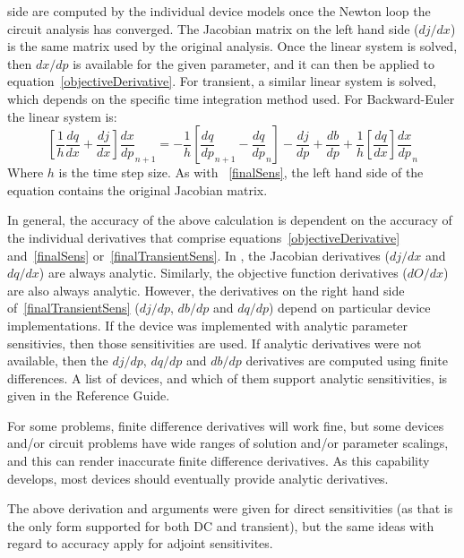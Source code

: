 side are computed by the individual device models once the Newton loop
the circuit analysis has converged.  The Jacobian matrix on the left
hand side ($dj/dx$) is the same matrix used by the original analysis.
Once the linear system is solved, then $dx/dp$ is available for the
given parameter, and it can then be applied to
equation~\ref{objectiveDerivative}.  For transient, a similar linear
system is solved, which depends on the specific time integration
method used.  For Backward-Euler the linear system is:
\begin{equation}
  \left[ \frac{1}{h} \frac{dq}{dx} 
  + \frac{dj}{dx} \right] \frac{dx}{dp}_{n+1} 
 =
  -\frac{1}{h} \left[ \frac{dq}{dp}_{n+1} - \frac{dq}{dp}_n \right] 
 - \frac{dj}{dp} 
 + \frac{db}{dp} 
 + \frac{1}{h} \left[ \frac{dq}{dx} \right] \frac{dx}{dp}_n 
 \label{finalTransientSens}
\end{equation}
\noindent Where $h$ is the time step size.  As with ~\ref{finalSens},
the left hand side of the equation contains the original Jacobian
matrix.

In general, the accuracy of the above calculation is dependent on the
accuracy of the individual derivatives that comprise
equations~\ref{objectiveDerivative} and~\ref{finalSens}
or~\ref{finalTransientSens}.  In \Xyce{}, the Jacobian derivatives
($dj/dx$ and $dq/dx$) are always analytic.  Similarly, the objective
function derivatives ($dO/dx$) are also always analytic.  However, the
derivatives on the right hand side of~\ref{finalTransientSens}
($dj/dp$, $db/dp$ and $dq/dp$) depend on particular device
implementations.  If the device was implemented with analytic
parameter sensitivies, then those sensitivities are used.  If analytic
derivatives were not available, then the $dj/dp$, $dq/dp$ and $db/dp$
derivatives are computed using finite differences.  A list of \Xyce{}
devices, and which of them support analytic sensitivities, is given in
the \Xyce{} Reference Guide\ReferenceGuide{}.

For some problems, finite difference derivatives will work fine, but
some devices and/or circuit problems have wide ranges of solution
and/or parameter scalings, and this can render inaccurate finite
difference derivatives.  As this capability develops, most devices
should eventually provide analytic derivatives.

The above derivation and arguments were given for direct sensitivities
(as that is the only form supported for both DC and transient), but
the same ideas with regard to accuracy apply for adjoint sensitivites.

